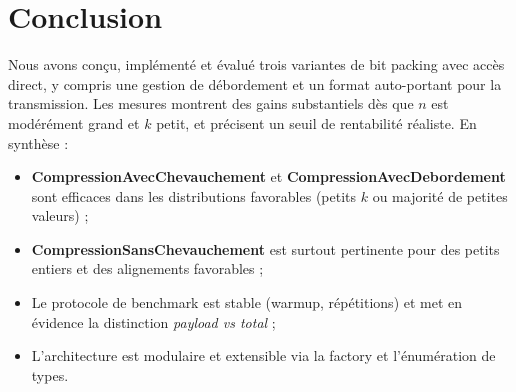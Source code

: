 \section{Conclusion}
\label{sec:conclusion}

Nous avons conçu, implémenté et évalué trois variantes de bit packing avec accès direct, y compris une gestion de débordement et un format auto-portant pour la transmission. Les mesures montrent des gains substantiels dès que $n$ est modérément grand et $k$ petit, et précisent un seuil de rentabilité réaliste. En synthèse :
\begin{itemize}
	\item \textbf{CompressionAvecChevauchement} et \textbf{CompressionAvecDebordement} sont efficaces dans les distributions favorables (petits $k$ ou majorité de petites valeurs) ;
	\item \textbf{CompressionSansChevauchement} est surtout pertinente pour des petits entiers et des alignements favorables ;
	\item Le protocole de benchmark est stable (warmup, répétitions) et met en évidence la distinction \emph{payload vs total} ;
	\item L'architecture est modulaire et extensible via la factory et l'énumération de types.
\end{itemize}
